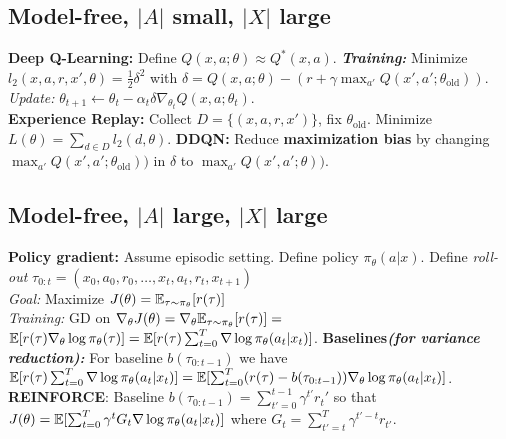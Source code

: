 \subsection{Model-free, $|A|$ small, $|X|$ large}
\textbf{Deep Q-Learning:} Define $Q(x,a;\theta) \approx Q^*(x,a)$.
\textbf{\emph{Training:}} Minimize $ l_2(x,a,r,x',\theta) = \frac{1}{2}\delta^2$ with $\delta = Q(x,a;\theta) - (r+\gamma\max_{a'}Q(x',a';\theta_\mathrm{old}))$.\\
\emph{Update:} $\theta_{t+1} \leftarrow \theta_t - \alpha_t\delta\nabla_{\theta_t}Q(x,a;\theta_t)$.\\
\textbf{Experience Replay:} Collect $D=\{(x,a,r,x')\}$, fix $\theta_\mathrm{old}$. Minimize $L(\theta) = \sum_{d\in D}l_2(d,\theta)$.
\textbf{DDQN:} Reduce \textbf{maximization bias} by changing $\max_{a'}Q(x',a';\theta_\mathrm{old}))$ in $\delta$ to $\max_{a'}Q(x',a';\theta))$. 

\subsection{Model-free, $|A|$ large, $|X|$ large}
\textbf{Policy gradient:} Assume episodic setting. Define policy $\pi_\theta(a|x)$. Define \emph{roll-out} $\tau_{0:t}=(x_0,a_0,r_0,\ldots,x_t,a_t,r_t,x_{t+1})$\\
\emph{Goal:} Maximize $J(\theta) = \mathbb{E}_{\tau\sim\pi_\theta}[r(\tau)]$\\
\emph{Training:} GD on $\nabla_\theta J(\theta) = \nabla_\theta \mathbb{E}_{\tau\sim\pi_\theta}[r(\tau)] = $\\$\mathbb{E}[r(\tau)\nabla_\theta\log\pi_\theta(\tau)] = \mathbb{E}[r(\tau)\sum_{t=0}^T\nabla\log\pi_\theta(a_t|x_t)]$.
\textbf{Baselines\textnormal{\emph{(for variance reduction):}}}
For baseline $b(\tau_{0:t-1})$ we have $\mathbb{E}[r(\tau)\sum_{t=0}^T\nabla\log\pi_\theta(a_t|x_t)] = \mathbb{E}[\sum_{t=0}^T(r(\tau)-b(\tau_{0:t-1}))\nabla_\theta\log\pi_\theta(a_t|x_t)]$.\\
\textbf{REINFORCE}: Baseline $b(\tau_{0:t-1}) = \sum_{t'=0}^{t-1} \gamma^{t'}r_t'$ so that $J(\theta) = \mathbb{E}[\sum_{t=0}^T\gamma^t G_t\nabla\log\pi_\theta(a_t|x_t)]$ where $G_t = \sum_{t'=t}^T\gamma^{t'-t}r_{t'}$.

